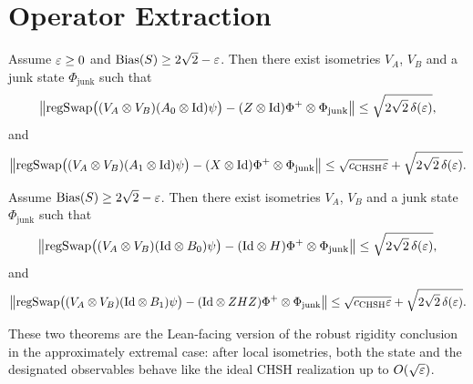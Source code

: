 \section{Operator Extraction}

\begin{theorem}
\label{thm:alice-operator-extraction}
Assume $\varepsilon \ge 0$ and $\operatorname{Bias}(S) \ge 2\sqrt{2} - \varepsilon$.
Then there exist isometries $V_A$, $V_B$ and a junk state $\Phi_{\mathrm{junk}}$ such that
\[
\left\lVert 
\mathrm{regSwap}\bigl((V_A \otimes V_B)(A_0 \otimes \mathrm{Id})\psi\bigr)
-
(Z \otimes \mathrm{Id})\Phi^+ \otimes \Phi_{\mathrm{junk}}
 \right\rVert
\le \sqrt{2\sqrt{2}\,\delta(\varepsilon)},
\]
and
\[
\left\lVert 
\mathrm{regSwap}\bigl((V_A \otimes V_B)(A_1 \otimes \mathrm{Id})\psi\bigr)
-
(X \otimes \mathrm{Id})\Phi^+ \otimes \Phi_{\mathrm{junk}}
 \right\rVert
\le \sqrt{c_{\mathrm{CHSH}} \varepsilon} + \sqrt{2\sqrt{2}\,\delta(\varepsilon)}.
\]
\end{theorem}

\begin{theorem}
\label{thm:bob-operator-extraction}
Assume $\operatorname{Bias}(S) \ge 2\sqrt{2} - \varepsilon$.
Then there exist isometries $V_A$, $V_B$ and a junk state $\Phi_{\mathrm{junk}}$ such that
\[
\left\lVert 
\mathrm{regSwap}\bigl((V_A \otimes V_B)(\mathrm{Id} \otimes B_0)\psi\bigr)
-
(\mathrm{Id} \otimes H)\Phi^+ \otimes \Phi_{\mathrm{junk}}
 \right\rVert
\le \sqrt{2\sqrt{2}\,\delta(\varepsilon)},
\]
and
\[
\left\lVert 
\mathrm{regSwap}\bigl((V_A \otimes V_B)(\mathrm{Id} \otimes B_1)\psi\bigr)
-
(\mathrm{Id} \otimes ZHZ)\Phi^+ \otimes \Phi_{\mathrm{junk}}
 \right\rVert
\le \sqrt{c_{\mathrm{CHSH}} \varepsilon} + \sqrt{2\sqrt{2}\,\delta(\varepsilon)}.
\]
\end{theorem}

\begin{remark}
These two theorems are the Lean-facing version of the robust rigidity conclusion in the approximately extremal case:
after local isometries, both the state and the designated observables behave like the ideal CHSH realization up to $O(\sqrt{\varepsilon})$.
\end{remark}

